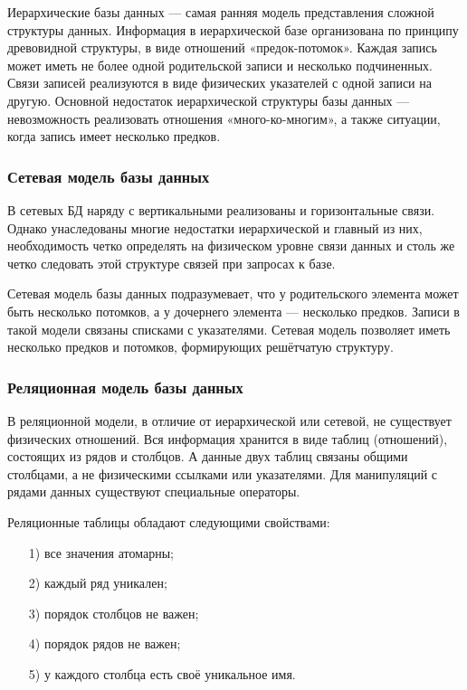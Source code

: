 Иерархические базы данных — самая ранняя модель представления сложной структуры данных. Информация в иерархической базе организована по принципу древовидной структуры, в виде отношений «предок-потомок». Каждая запись может иметь не более одной родительской записи и несколько подчиненных. Связи записей реализуются в виде физических указателей с одной записи на другую. Основной недостаток иерархической структуры базы данных — невозможность реализовать отношения «много-ко-многим», а также ситуации, когда запись имеет несколько предков\cite{modelDB}.

\subsubsection{Сетевая модель базы данных}
В сетевых БД наряду с вертикальными реализованы и горизонтальные связи. Однако унаследованы многие недостатки иерархической и главный из них, необходимость четко определять на физическом уровне связи данных и столь же четко следовать этой структуре связей при запросах к базе\cite{modelDB}.

Сетевая модель базы данных подразумевает, что у родительского элемента может быть несколько потомков, а у дочернего элемента — несколько предков. Записи в такой модели связаны списками с указателями. 
Сетевая модель позволяет иметь несколько предков и потомков, формирующих решётчатую структуру.
\subsubsection{Реляционная модель базы данных}
В реляционной модели, в отличие от иерархической или сетевой, не существует физических отношений. Вся информация хранится в виде таблиц (отношений), состоящих из рядов и столбцов. А данные двух таблиц связаны общими столбцами, а не физическими ссылками или указателями. Для манипуляций с рядами данных существуют специальные операторы.

Реляционные таблицы обладают следующими свойствами:
\begin{itemize}
	\item[1)] все значения атомарны;
	\item[2)] каждый ряд уникален;
	\item[3)] порядок столбцов не важен;
	\item[4)] порядок рядов не важен;
	\item[5)] у каждого столбца есть своё уникальное имя.
\end{itemize}

